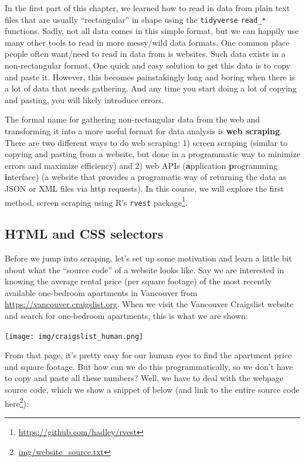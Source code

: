 \documentclass[
]{krantz}
\renewcommand{\href}[2]{#2\footnote{\url{#1}}}
\begin{document}
In the first part of this chapter, we learned how to read in data from plain text files that are usually ``rectangular'' in shape using the \texttt{tidyverse} \texttt{read\_*} functions. Sadly, not all data comes in this simple format, but we can happily use many other tools to read in more messy/wild data formats. One common place people often want/need to read in data from is websites. Such data exists in a non-rectangular format. One quick and easy solution to get this data is to copy and paste it. However, this becomes painstakingly long and boring when there is a lot of data that needs gathering. And any time you start doing a lot of copying and pasting, you will likely introduce errors.

The formal name for gathering non-rectangular data from the web and transforming it into a more useful format for data analysis is \textbf{web scraping}. There are two different ways to do web scraping: 1) screen scraping (similar to copying and pasting from a website, but done in a programmatic way to minimize errors and maximize efficiency) and 2) web APIs (\textbf{a}pplication \textbf{p}rogramming \textbf{i}nterface) (a website that provides a programatic way of returning the data as JSON or XML files via http requests). In this course, we will explore the first method, screen scraping using R's \href{https://github.com/hadley/rvest}{\texttt{rvest} package}.

\hypertarget{html-and-css-selectors}{%
\subsection{HTML and CSS selectors}\label{html-and-css-selectors}}

Before we jump into scraping, let's set up some motivation and learn a little bit about what the ``source code'' of a website looks like. Say we are interested in knowing the average rental price (per square footage) of the most recently available one-bedroom apartments in Vancouver from \url{https://vancouver.craigslist.org}. When we visit the Vancouver Craigslist website and search for one-bedroom apartments, this is what we are shown:

\texttt{[image: img/craigslist\_human.png]}

From that page, it's pretty easy for our human eyes to find the apartment price and square footage. But how can we do this programmatically, so we don't have to copy and paste all these numbers? Well, we have to deal with the webpage source code, which we show a snippet of below (and link to the \href{img/website_source.txt}{entire source code here}):
\end{document}
